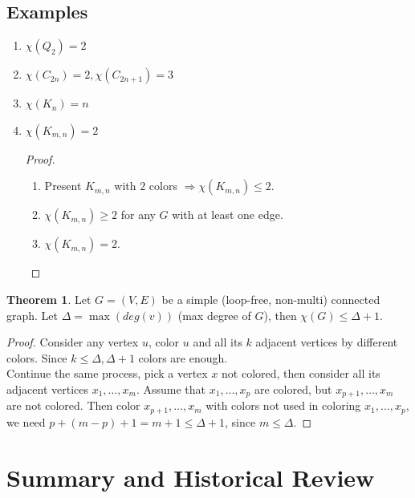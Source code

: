 \documentclass[letter]{book}
\theoremstyle{definition}
\newtheorem*{theorem*}{Theorem}
\theoremstyle{definition}
\theoremstyle{remark}
\begin{document}
\subsection*{Examples}
    \begin{enumerate}
        \item $\chi(Q_2)=2$
        \item $\chi(C_{2n})=2, \chi(C_{2n+1})=3$
        \item $\chi(K_{n})=n$
        \item $\chi(K_{m,n})=2$
            \begin{proof}
                \begin{enumerate}
                    \item Present $K_{m,n}$ with $2$ colors $\Rightarrow \chi(K_{m,n})\leq2$.
                    \item $\chi(K_{m,n})\geq2$ for any $G$ with at least one edge.
                    \item $\chi(K_{m,n})=2$.
                \end{enumerate}
            \end{proof}
    \end{enumerate}
\begin{theorem*}
    Let $G=(V,E)$ be a simple (loop-free, non-multi) connected graph. Let $\Delta=\max(deg(v))$ (max degree of $G$), then $\chi(G)\leq \Delta+1$.
\end{theorem*}
\begin{proof}
    Consider any vertex $u$, color $u$ and all its $k$ adjacent vertices by different colors. Since $k\leq \Delta, \Delta+1$ colors are enough.\\
    Continue the same process, pick a vertex $x$ not colored, then consider all its adjacent vertices $x_1,\ldots, x_m$. Assume that $x_1,\ldots, x_p$ are colored, but $x_{p+1},\ldots, x_m$ are not colored. Then color $x_{p+1},\ldots, x_m$ with colors not used in coloring $x_1,\ldots, x_p$, we need $p+(m-p)+1=m+1\leq \Delta+1$, since $m\leq \Delta$.
\end{proof}
\section{Summary and Historical Review}
\end{document}
